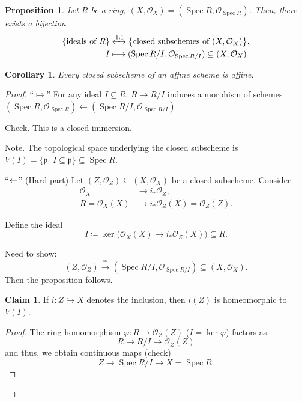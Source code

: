 \documentclass[12pt]{article}
\DeclareMathOperator{\Spec}{Spec}
\newtheorem*{proposition}{Proposition}
\newtheorem*{corollary}{Corollary}
\theoremstyle{definition}
\newtheorem{claim+}{Claim}
\begin{document}
\begin{proposition}
Let $R$ be a ring, $(X,\mathcal O_X)=(\Spec R,\mathcal O_{\Spec R})$. Then, there exists a bijection
\begin{align*}
\{\text{ideals of }R\}&\xleftrightarrow{1:1}\big\{\text{closed subschemes of }(X,\mathcal O_X)\big\}.\\I&\longmapsto(\Spec R/I,\mathcal O_{\Spec R/I})\subseteq(X,\mathcal O_X)
\end{align*}
\end{proposition}

\begin{corollary}
Every closed subscheme of an affine scheme is affine.
\end{corollary}

\begin{proof}
``$\mapsto$'' For any ideal $I\subseteq R$, $R\rightarrow R/I$ induces a morphism of schemes $(\Spec R,\mathcal O_{\Spec R})\leftarrow(\Spec R/I,\mathcal O_{\Spec R/I})$.

Check. This is a closed immersion.

Note. The topological space underlying the closed subscheme is $V(I)=\{\mathfrak p\,|\,I\subseteq\mathfrak p\}\subseteq\Spec R$.

``$\leftarrow\!\shortmid$'' (Hard part) Let $(Z,\mathcal O_Z)\subseteq(X,\mathcal O_X)$ be a closed subscheme. Consider
\begin{align*}
\mathcal O_X&\longrightarrow i_*\mathcal O_Z,\\R=\mathcal O_X(X)&\longrightarrow i_*\mathcal O_Z(X)=\mathcal O_Z(Z).
\end{align*}

Define the ideal
\[I\coloneqq\ker\big(\mathcal O_X(X)\rightarrow i_*\mathcal O_Z(X)\big)\subseteq R.\]

Need to show:
\[(Z,\mathcal O_Z)\overset\cong\longrightarrow(\Spec R/I,\mathcal O_{\Spec R/I})\subseteq(X,\mathcal O_X).\]
Then the proposition follows.

\begin{claim+}
If $i:Z\hookrightarrow X$ denotes the inclusion, then $i(Z)$ is homeomorphic to $V(I)$.
\end{claim+}

\begin{proof}
The ring homomorphism $\varphi:R\rightarrow\mathcal O_Z(Z)$ ($I=\ker\varphi$) factors as
\[R\longrightarrow R/I\longrightarrow\mathcal O_Z(Z)\]
and thus, we obtain continuous maps (check)
\[Z\longrightarrow\Spec R/I\longrightarrow X=\Spec R.\]


\end{proof}
\end{proof}
\end{document}

